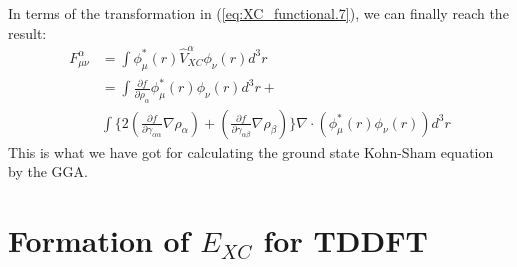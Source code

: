 In terms of the transformation in (\ref{eq:XC_functional.7}), we can
finally reach the result:
\begin{equation}
  \label{eq:XC_functional.8}
  \begin{split}
      F^{\alpha}_{\mu\nu} &= \int
  \phi^{*}_{\mu}(r)\hat{V}^{\alpha}_{XC}\phi_{\nu}(r) d^{3}r  \\
  &= \int \frac{\partial f}{\partial
      \rho_{\alpha}}\phi^{*}_{\mu}(r) \phi_{\nu}(r)d^{3}r + \\
  &\int\Bigg\{2\left( \frac{\partial f} {\partial \gamma_{\alpha\alpha}}
    \nabla\rho_{\alpha}\right) + \left( \frac{\partial f} {\partial
      \gamma_{\alpha\beta}} \nabla\rho_{\beta} \right)
  \Bigg\}\nabla\cdot(\phi^{*}_{\mu}(r) \phi_{\nu}(r))d^{3}r
  \end{split}
\end{equation}
This is what we have got for calculating the ground state Kohn-Sham
equation by the GGA.

\section{Formation of $E_{XC}$ for TDDFT}
%
%
%
%





